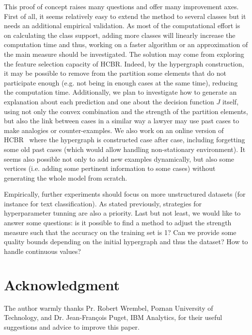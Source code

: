 \documentclass[sigconf,edbt]{acmart-edbt-workshops}
\def\HCBR{{\sc HCBR}}
\begin{document}
This proof of concept raises many questions and offer many improvement axes. First of all, it seems relatively easy to extend the method to several classes but it needs an additional empirical validation. As most of the computational effort is on calculating the class support, adding more classes will linearly increase the computation time and thus, working on a faster algorithm or an approximation of the main measure should be investigated. The solution may come from exploring the feature selection capacity of \HCBR. Indeed, by the hypergraph construction, it may be possible to remove from the partition some elements that do not participate enough (e.g. not being in enough cases at the same time), reducing the computation time.
Additionally, we plan to investigate how to generate an explanation about each prediction and one about the decision function $J$ itself, using not only the convex combination and the strength of the partition elements, but also the link between cases in a similar way a lawyer may use past cases to make analogies or counter-examples. We also work on an online version of \HCBR~ where the hypergraph is constructed case after case, including forgetting some old past cases (which would allow handling non-stationary environment). It seems also possible not only to add new examples dynamically, but also some vertices (i.e. adding some pertinent information to some cases) without generating the whole model from scratch. 

Empirically, further experiments should focus on more unstructured datasets (for instance for text classification). As stated previously, strategies for hyperparameter tunning are also a priority.
Last but not least, we would like to answer some questions: is it possible to find a method to adjust the strength measure such that the accuracy on the training set is 1? Can we provide some quality bounds depending on the initial hypergraph and thus the dataset? How to handle continuous values?

\section*{Acknowledgment}

The author warmly thanks Pr. Robert Wrembel, Poznan University of Technology, and Dr. Jean-Fran\c{c}ois Puget, IBM Analytics, for their useful suggestions and advice to improve this paper.


 
\end{document}
